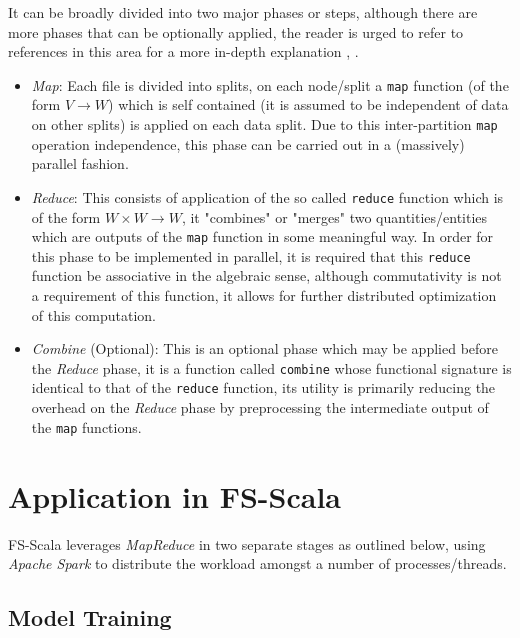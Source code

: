 It can be broadly divided into two major phases or steps, although there are more phases that can be optionally applied, the reader is urged to refer to references in this area for a more in-depth explanation \cite{HDFS}, \cite{HadoopBook} \cite{Yarn}.

\begin{itemize}
\item \textit{Map}: Each file is divided into splits, on each node/split a \texttt{map} function (of the form $V \longrightarrow W$) which is self contained (it is assumed to be independent of data on other splits) is applied on each data split. Due to this inter-partition \texttt{map} operation independence, this phase can be carried out in a (massively) parallel fashion.

\item \textit{Reduce}: This consists of application of the so called \texttt{reduce} function which is of the form $W \times W \longrightarrow W$, it "combines" or "merges" two quantities/entities which are outputs of the \texttt{map} function in some meaningful way. In order for this phase to be implemented in parallel, it is required that this \texttt{reduce} function be associative in the algebraic sense, although commutativity is not a requirement of this function, it allows for further distributed optimization of this computation.

\item \textit{Combine} (Optional): This is an optional phase which may be applied before the \textit{Reduce} phase, it is a function called \texttt{combine} whose functional signature is identical to that of the \texttt{reduce} function, its utility is primarily reducing the overhead on the \textit{Reduce} phase by preprocessing the intermediate output of the \texttt{map} functions. 
\end{itemize}


\section{Application in FS-Scala}
FS-Scala leverages \textit{MapReduce} in two separate stages as outlined below, using \textit{Apache Spark} to distribute the workload amongst a number of processes/threads.


\subsection*{Model Training}

